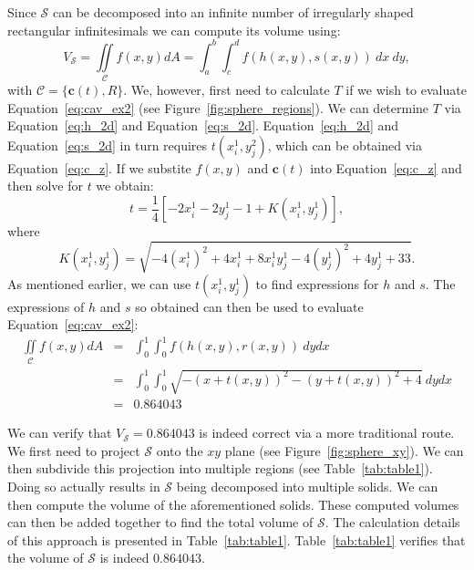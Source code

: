 \documentclass{article}
\theoremstyle{theorem}
\theoremstyle{definition}
\begin{document}
\noindent
Since $\mathcal{S}$ can be decomposed into an infinite number of irregularly shaped rectangular infinitesimals we can compute its volume using:
\begin{equation}
\label{eq:cav_ex2}
V_{\mathcal{S}} = \iint\limits_{\!\mathcal{C}} f(x,y) dA =  \int_a^b\int_c^d f(h(x,y),s(x,y))~dx~dy,
\end{equation}
with $\mathcal{C}=\{\mathbf{c}(t),R\}$. We, however, first need to calculate $T$ if we wish to evaluate Equation~\ref{eq:cav_ex2} (see Figure~\ref{fig:sphere_regions}). We can determine $T$ via 
Equation~\eqref{eq:h_2d} and Equation~\eqref{eq:s_2d}. Equation~\eqref{eq:h_2d} and Equation~\eqref{eq:s_2d} in turn requires $t(x_i^1,y_j^2)$, which can be obtained via Equation~\eqref{eq:c_z}.
If we substite $f(x,y)$ and $\mathbf{c}(t)$ into Equation~\eqref{eq:c_z} and then solve for $t$ we obtain:
\begin{equation}
t = \frac{1}{4}[-2 x_{i}^1 - 2 y_{j}^1  -  1 + K(x_{i}^1,y_{j}^1)],
\end{equation}
where
\begin{equation}
K(x_{i}^1,y_{j}^1) = \sqrt{-4(x_{i}^1)^2+4x_{i}^1+8x_{i}^1y_{j}^1-4(y_{j}^1)^2+4y_{j}^1 + 33}. 
\end{equation}
As mentioned earlier, we can use $t(x_i^1,y_j^1)$ to find expressions for $h$ and $s$. The expressions of $h$ and $s$ so obtained can then be used to evaluate Equation~\eqref{eq:cav_ex2}:  
\begin{eqnarray}
\iint\limits_{\!\mathcal{C}} f(x,y) dA &=& \int_0^1\int_0^1 f(h(x,y),r(x,y))~dydx\\
&=& \int_0^1 \int_0^1 \sqrt{-(x+t(x,y))^2 - (y+t(x,y))^2 + 4} ~dydx\\
&=& 0.864043
\end{eqnarray}

\noindent
We can verify that $V_{\mathcal{S}}=0.864043$ is indeed correct via a more traditional route. We first need to project $\mathcal{S}$ onto the $xy$ plane (see Figure~\ref{fig:sphere_xy}). We can then subdivide this projection into multiple regions (see Table~\ref{tab:table1}). Doing so actually results in $\mathcal{S}$ being decomposed into multiple solids. We can then 
compute the volume of the aforementioned solids. These computed volumes can then be added together to find the total volume of $\mathcal{S}$. The calculation details 
of this approach is presented in Table~\ref{tab:table1}. Table~\ref{tab:table1} verifies that the volume of $\mathcal{S}$ is indeed $0.864043$.
\end{document}
